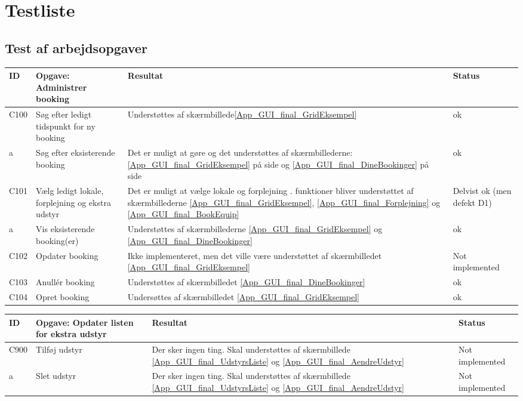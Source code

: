 \section{Testliste}
\label{App_Test_ListOfTest}

\subsection{Test af arbejdsopgaver}
\label{App_Test_ListOfTest_Work}

\begin{tabular}{ |p{1cm}| p{5cm} | p{4cm} | p{1cm} | }
\hline
	ID & Opgave: Administrer booking & Resultat & Status\\ 
\hline
	C100 & Søg efter ledigt tidspunkt for ny booking & Understøttes af skærmbillede\ref{App_GUI_final_GridEksempel} & ok \\
\hline
	a & Søg efter eksisterende booking & Det er muligt at gøre og det understøttes af skærmbillederne: \ref{App_GUI_final_GridEksempel} på side  og \ref{App_GUI_final_DineBookinger} på side \pageref{App_GUI_final_DineBookinger} & ok \\
\hline
	C101 & Vælg ledigt lokale, forplejning og ekstra udstyr & Det er muligt at vælge lokale og forplejning . funktioner bliver understøttet af skærmbillederne \ref{App_GUI_final_GridEksempel}, \ref{App_GUI_final_Forplejning} og \ref{App_GUI_final_BookEquip}  & Delvist ok (men defekt D1) \\
\hline
	a & Vis eksisterende booking(er) & Understøttes af skærmbillederne \ref{App_GUI_final_GridEksempel} og \ref{App_GUI_final_DineBookinger} & ok \\
\hline
	C102 & Opdater booking & Ikke implementeret, men det ville være understøttet af skærmbilledet \ref{App_GUI_final_GridEksempel} & Not implemented \\
\hline
	C103 & Anullér booking & Understøttes af skærmbilledet \ref{App_GUI_final_DineBookinger} & ok \\
\hline
	C104 & Opret booking & Undersøttes af skærmbilledet \ref{App_GUI_final_GridEksempel} & ok \\
\hline
\end{tabular}

\begin{tabular}{ |p{1cm}| p{5cm} | p{4cm} | p{1cm} | }
\hline
	ID & Opgave: Opdater listen for ekstra udstyr & Resultat & Status\\ 
\hline
	C900 & Tilføj udstyr & Der sker ingen ting. Skal understøttes af skærmbillede \ref{App_GUI_final_UdstyrsListe} og \ref{App_GUI_final_AendreUdstyr} & Not implemented \\
\hline
	a & Slet udstyr &Der sker ingen ting. Skal understøttes af skærmbillede \ref{App_GUI_final_UdstyrsListe} og \ref{App_GUI_final_AendreUdstyr} & Not implemented \\
\end{tabular}

